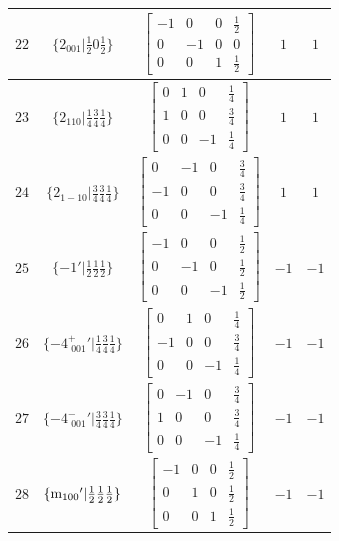 \documentclass[fleqn,8pt]{jsarticle}
\begin{document}
\begin{longtable}{ccccc}
$ 22 $ & $ \{2{}_{001}|\frac{1}{2} 0 \frac{1}{2}\} $ & $ \begin{bmatrix} -1 & 0 & 0 & \frac{1}{2} \\ 0 & -1 & 0 & 0 \\ 0 & 0 & 1 & \frac{1}{2} \end{bmatrix} $ & $ 1 $ & $ 1 $ \\ \hline
$ 23 $ & $ \{2{}_{110}|\frac{1}{4} \frac{3}{4} \frac{1}{4}\} $ & $ \begin{bmatrix} 0 & 1 & 0 & \frac{1}{4} \\ 1 & 0 & 0 & \frac{3}{4} \\ 0 & 0 & -1 & \frac{1}{4} \end{bmatrix} $ & $ 1 $ & $ 1 $ \\ \hline
$ 24 $ & $ \{2{}_{1-10}|\frac{3}{4} \frac{3}{4} \frac{1}{4}\} $ & $ \begin{bmatrix} 0 & -1 & 0 & \frac{3}{4} \\ -1 & 0 & 0 & \frac{3}{4} \\ 0 & 0 & -1 & \frac{1}{4} \end{bmatrix} $ & $ 1 $ & $ 1 $ \\ \hline
$ 25 $ & $ \{-1{}'|\frac{1}{2} \frac{1}{2} \frac{1}{2}\} $ & $ \begin{bmatrix} -1 & 0 & 0 & \frac{1}{2} \\ 0 & -1 & 0 & \frac{1}{2} \\ 0 & 0 & -1 & \frac{1}{2} \end{bmatrix} $ & $ -1 $ & $ -1 $ \\ \hline
$ 26 $ & $ \{-4^{+}_{\,\,001}{}'|\frac{1}{4} \frac{3}{4} \frac{1}{4}\} $ & $ \begin{bmatrix} 0 & 1 & 0 & \frac{1}{4} \\ -1 & 0 & 0 & \frac{3}{4} \\ 0 & 0 & -1 & \frac{1}{4} \end{bmatrix} $ & $ -1 $ & $ -1 $ \\ \hline
$ 27 $ & $ \{-4^{-}_{\,\,001}{}'|\frac{3}{4} \frac{3}{4} \frac{1}{4}\} $ & $ \begin{bmatrix} 0 & -1 & 0 & \frac{3}{4} \\ 1 & 0 & 0 & \frac{3}{4} \\ 0 & 0 & -1 & \frac{1}{4} \end{bmatrix} $ & $ -1 $ & $ -1 $ \\ \hline
$ 28 $ & $ \{{\rm m}_{100}{}'|\frac{1}{2} \frac{1}{2} \frac{1}{2}\} $ & $ \begin{bmatrix} -1 & 0 & 0 & \frac{1}{2} \\ 0 & 1 & 0 & \frac{1}{2} \\ 0 & 0 & 1 & \frac{1}{2} \end{bmatrix} $ & $ -1 $ & $ -1 $ \\ \hline

\end{longtable}
\end{document}
